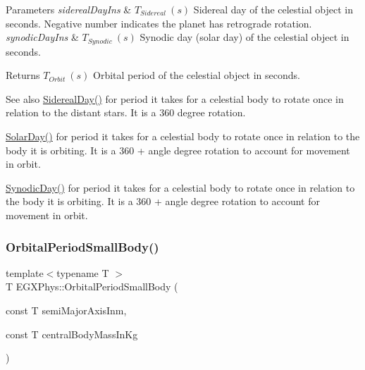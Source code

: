 \begin{DoxyParams}{Parameters}
{\em sidereal\+Day\+Ins} & $ T_{Sidereal}\ (s)$ Sidereal day of the celestial object in seconds. Negative number indicates the planet has retrograde rotation. \\
\hline
{\em synodic\+Day\+Ins} & $ T_{Synodic}\ (s)$ Synodic day (solar day) of the celestial object in seconds. \\
\hline
\end{DoxyParams}
\begin{DoxyReturn}{Returns}
$ T_{Orbit}\ (s)$ Orbital period of the celestial object in seconds. 
\end{DoxyReturn}
\begin{DoxySeeAlso}{See also}
\mbox{\hyperlink{group___e_g_x_phys-_astrophysic-_sidereal_day_ga587900d5fc755228c1bb5121cd7965c6}{Sidereal\+Day()}} for period it takes for a celestial body to rotate once in relation to the distant stars. It is a 360 degree rotation. 

\mbox{\hyperlink{group___e_g_x_phys-_astrophysic-_solar_day_gae321e0dd0c031a57c45b15dc819635e0}{Solar\+Day()}} for period it takes for a celestial body to rotate once in relation to the body it is orbiting. It is a 360 + angle degree rotation to account for movement in orbit. 

\mbox{\hyperlink{group___e_g_x_phys-_astrophysic-_synodic_day_ga637140842bc008c87d90e65b551cbac7}{Synodic\+Day()}} for period it takes for a celestial body to rotate once in relation to the body it is orbiting. It is a 360 + angle degree rotation to account for movement in orbit. 
\end{DoxySeeAlso}
\mbox{\label{group___e_g_x_phys-_astrophysic-_orbital_period_ga5d4cc706d875fd82a83e566ade16546d}} 
\subsubsection{\texorpdfstring{Orbital\+Period\+Small\+Body()}{OrbitalPeriodSmallBody()}}
{\footnotesize\ttfamily template$<$typename T $>$ \\
T E\+G\+X\+Phys\+::\+Orbital\+Period\+Small\+Body (\begin{DoxyParamCaption}\item[{const T}]{semi\+Major\+Axis\+Inm,  }\item[{const T}]{central\+Body\+Mass\+In\+Kg }\end{DoxyParamCaption})}



